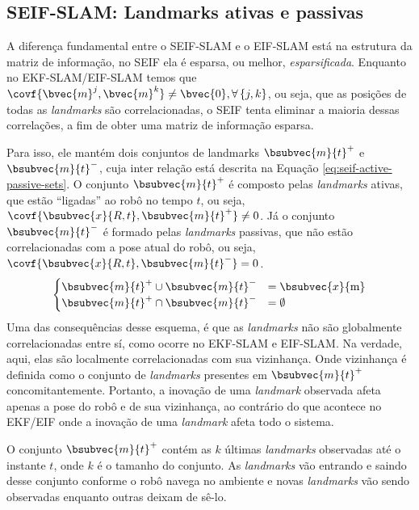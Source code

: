 \subsection{SEIF-SLAM: Landmarks ativas e passivas}
\label{sec:seif-active-passive-landmarks}
A diferença fundamental entre o SEIF-SLAM e o EIF-SLAM está na estrutura da matriz de informação, no SEIF ela é esparsa, ou melhor, 
\emph{esparsificada}. Enquanto no EKF-SLAM/EIF-SLAM temos 
que $\covf{\bvec{m}^j, \bvec{m}^k} \neq \bvec{0}, 
\forall\, \{j,k\}$, ou seja, que as posições de todas as 
\textit{landmarks} são correlacionadas, o SEIF tenta eliminar a maioria 
dessas correlações, a fim de obter uma matriz de informação esparsa.

Para isso, ele mantém dois conjuntos de landmarks $\bsubvec{m}{t}^+$ e $\bsubvec{m}{t}^-$, cuja inter relação está descrita na Equação \ref{eq:seif-active-passive-sets}. O conjunto $\bsubvec{m}{t}^+$ é composto pelas \textit{landmarks} ativas, que estão
``ligadas'' ao robô no tempo $t$, ou seja, 
$\covf{\bsubvec{x}{R, t}, \bsubvec{m}{t}^+} \neq 0$. Já o conjunto 
$\bsubvec{m}{t}^-$ é 
formado pelas \textit{landmarks} passivas, que não estão correlacionadas com 
a pose atual do robô, ou seja, 
$\covf{\bsubvec{x}{R, t}, \bsubvec{m}{t}^-} = 0$.
\begin{equation}
\begin{cases}
  \bsubvec{m}{t}^+ \cup \bsubvec{m}{t}^- &= \bsubvec{x}{\mathrm{m}} \\
  \bsubvec{m}{t}^+ \cap \bsubvec{m}{t}^- &= \emptyset
\end{cases}
\label{eq:seif-active-passive-sets}
\end{equation}
Uma das consequências desse esquema, é que as \textit{landmarks} não são 
globalmente correlacionadas entre sí, como ocorre no EKF-SLAM e EIF-SLAM. Na 
verdade, aqui, elas são localmente correlacionadas com sua vizinhança. Onde 
vizinhança é definida como o conjunto de \textit{landmarks} presentes em 
$\bsubvec{m}{t}^+$ concomitantemente. Portanto, a inovação de uma 
\textit{landmark} observada afeta apenas a pose do robô e de sua vizinhança, 
ao contrário do que acontece no EKF/EIF onde a inovação de uma 
\textit{landmark} afeta todo o sistema.

O conjunto $\bsubvec{m}{t}^+$ contém as $k$ últimas \textit{landmarks} 
observadas até o instante $t$, onde $k$ é o tamanho do conjunto. As 
\textit{landmarks} vão entrando e saindo desse conjunto conforme o robô 
navega no ambiente e novas \textit{landmarks} vão sendo observadas enquanto 
outras deixam de sê-lo.

